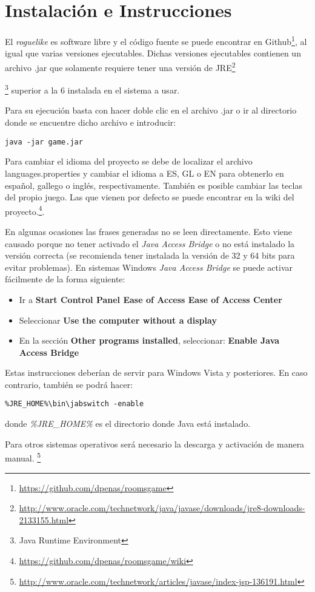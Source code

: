 \chapter{Instalación e Instrucciones}
\label{ref:instalacion}

El \textit{roguelike} es software libre y el código fuente se puede encontrar en Github\footnote{\url{https://github.com/dpenas/roomsgame}}, al igual que varias versiones ejecutables. Dichas versiones ejecutables contienen un archivo .jar que solamente requiere tener una versión de JRE\footnote{\url{http://www.oracle.com/technetwork/java/javase/downloads/jre8-downloads-2133155.html}}{\footnote{Java Runtime Environment} superior a la 6 instalada en el sistema a usar. 

Para su ejecución basta con hacer doble clic en el archivo .jar o ir al directorio donde se encuentre dicho archivo e introducir:

\begin{lstlisting}[label=lst:bash,caption=Comando para la ejecución del videojuego]
java -jar game.jar
\end{lstlisting}

Para cambiar el idioma del proyecto se debe de localizar el archivo languages.properties y cambiar el idioma a ES, GL o EN para obtenerlo en español, gallego o inglés, respectivamente. También es posible cambiar las teclas del propio juego. Las que vienen por defecto se puede encontrar en la wiki del proyecto.\footnote{\url{https://github.com/dpenas/roomsgame/wiki}}.

En algunas ocasiones las frases generadas no se leen directamente. Esto viene causado porque no tener activado el \textit{Java Access Bridge} o no está instalado la versión correcta (se recomienda tener instalada la versión de 32 y 64 bits para evitar problemas). 
En sistemas Windows \textit{Java Access Bridge} se puede activar fácilmente de la forma siguiente:

\begin{itemize}
\item Ir a \textbf{Start \textrightarrow Control Panel \textrightarrow Ease of Access \textrightarrow Ease of Access Center}
\item Seleccionar \textbf{Use the computer without a display}
\item En la sección \textbf{Other programs installed}, seleccionar: \textbf{Enable Java Access Bridge}
\end{itemize}

Estas instrucciones deberían de servir para Windows Vista y posteriores. En caso contrario, también se podrá hacer:

\begin{verbatim}
%JRE_HOME%\bin\jabswitch -enable
\end{verbatim}

donde \textit{\%JRE\_HOME\%} es el directorio donde Java está instalado.

Para otros sistemas operativos será necesario la descarga y activación de manera manual.  \footnote{\url{http://www.oracle.com/technetwork/articles/javase/index-jsp-136191.html}}}